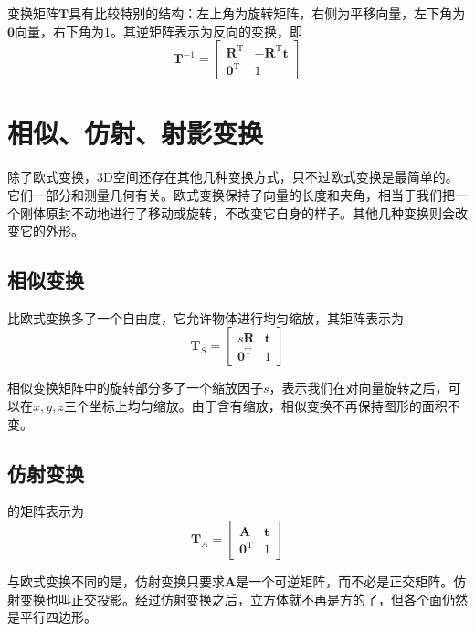 变换矩阵$\bm{T}$具有比较特别的结构：左上角为旋转矩阵，右侧为平移向量，左下角为$\bm{0}$向量，右下角为$1$。其逆矩阵表示为反向的变换，即
\begin{equation}
    \bm{T}^{-1} = 
    \begin{bmatrix}
        \bm{R}^{\text{T}} & - \bm{R}^{\text{T}} \bm{t} \\
        \bm{0}^{\text{T}} & 1
    \end{bmatrix}
\end{equation}


\section{相似、仿射、射影变换}
除了欧式变换，3D空间还存在其他几种变换方式，只不过欧式变换是最简单的。它们一部分和测量几何有关。欧式变换保持了向量的长度和夹角，相当于我们把一个刚体原封不动地进行了移动或旋转，不改变它自身的样子。其他几种变换则会改变它的外形。

\subsection{相似变换}
比欧式变换多了一个自由度，它允许物体进行均匀缩放，其矩阵表示为
\begin{equation}
    \bm{T}_S = 
    \begin{bmatrix}
        s \bm{R} & \bm{t} \\
        \bm{0}^{\text{T}} & 1
    \end{bmatrix}
\end{equation}

相似变换矩阵中的旋转部分多了一个缩放因子$s$，表示我们在对向量旋转之后，可以在$x,y,z$三个坐标上均匀缩放。由于含有缩放，相似变换不再保持图形的面积不变。


\subsection{仿射变换}
的矩阵表示为
\begin{equation}
    \bm{T}_A = 
    \begin{bmatrix}
        \bm{A} & \bm{t} \\
        \bm{0}^{\text{T}} & 1
    \end{bmatrix}
\end{equation}

与欧式变换不同的是，仿射变换只要求$\bm{A}$是一个可逆矩阵，而不必是正交矩阵。仿射变换也叫正交投影。经过仿射变换之后，立方体就不再是方的了，但各个面仍然是平行四边形。

